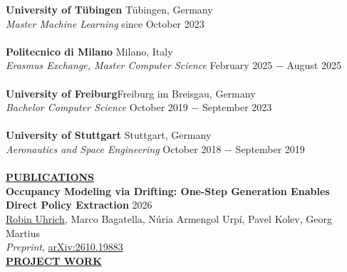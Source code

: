 \documentclass{article}
\begin{document}
\noindent\textbf{University of Tübingen} \hfill Tübingen, Germany  \\
\textit{Master Machine Learning} \hfill since October 2023 \\ \\
\textbf{Politecnico di Milano} \hfill Milano, Italy  \\
\textit{Erasmus Exchange, Master Computer Science} \hfill February 2025 $-$ August 2025 \\ \\
\textbf{University of Freiburg}\hfill Freiburg im Breisgau, Germany  \\
\textit{Bachelor Computer Science} \hfill October 2019 $-$ September 2023 \\ \\
\textbf{University of Stuttgart} \hfill Stuttgart, Germany \\
\textit{Aeronautics and Space Engineering} \hfill October 2018 $-$ September 2019 \\  \\


\noindent \textbf{\underline{PUBLICATIONS}} \\

\noindent \textbf{Occupancy Modeling via Drifting: One-Step Generation Enables Direct Policy Extraction} \hfill 2026 \\
\underline{Robin Uhrich}, Marco Bagatella, Núria Armengol Urpí, Pavel Kolev, Georg Martius \\
\textit{Preprint}, \href{https://arxiv.org/abs/2610.19883}{arXiv:2610.19883}
\vspace{0.4cm}\\

%
%
\noindent \textbf{\underline{PROJECT WORK}} \\
\end{document}
